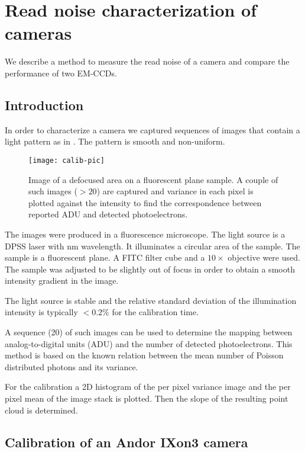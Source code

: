 \chapter{Read noise characterization of cameras}
\label{sec:ccd-meas}
\begin{summary}
  We describe a method to measure the read noise of a camera and
  compare the performance of two EM-CCDs.
\end{summary}
\section{Introduction}
In order to characterize a camera we captured sequences of images that
contain a light pattern as in . The pattern is
smooth and non-uniform.
\begin{figure}[!hbt]
  \centering
  \texttt{[image: calib-pic]}
  \caption{Image of a defocused area on a fluorescent plane sample. A
    couple of such images ($>20$) are captured and variance in each
    pixel is plotted against the intensity to find the correspondence
    between reported ADU and detected photoelectrons.}
  \label{fig:calib-pic}
\end{figure}
The images were produced in a fluorescence microscope. The light
source is a DPSS laser with \unit[473]{nm} wavelength. It
illuminates a circular area of the sample. The sample is a fluorescent
plane. A FITC filter cube and a $10\times$ objective were used. The
sample was adjusted to be slightly out of focus in order to obtain a
smooth intensity gradient in the image.

The light source is stable and the relative standard deviation of the
illumination intensity is typically $<0.2\%$ for the calibration
time. 

A sequence (20) of such images can be used to determine the mapping
between analog-to-digital units (ADU)
 and the number of detected
photoelectrons. This method is based on the known relation between the
mean number of Poisson distributed photons and its variance.

For the calibration a 2D histogram of the per pixel
variance image and the per pixel mean of the image stack is
plotted. Then the slope of the resulting point cloud is determined.

\section{Calibration of an Andor IXon3 camera}

